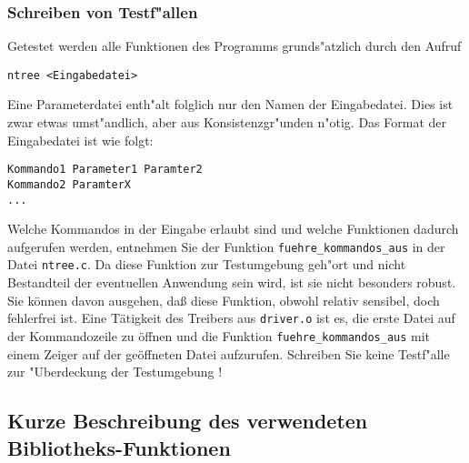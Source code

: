 \subsubsection*{Schreiben von Testf"allen}

Getestet werden alle Funktionen des Programms grunds"atzlich durch den
Aufruf 
\begin{verbatim}
ntree <Eingabedatei>
\end{verbatim}
Eine Parameterdatei enth"alt folglich nur den Namen der Eingabedatei. Dies
ist zwar etwas umst"andlich, aber aus Konsistenzgr"unden n"otig.
Das Format der Eingabedatei ist wie folgt:
\begin{verbatim}
Kommando1 Parameter1 Paramter2
Kommando2 ParamterX
...
\end{verbatim}

Welche Kommandos in der Eingabe erlaubt sind und welche Funktionen
dadurch aufgerufen werden, entnehmen Sie der Funktion 
{\tt fuehre\_kommandos\_aus} in der Datei {\tt ntree.c}.
Da diese Funktion zur Testumgebung geh"ort und nicht Bestandteil der 
eventuellen Anwendung sein wird, ist sie nicht besonders robust.
Sie k\"onnen davon ausgehen, da{\ss} diese Funktion, obwohl
relativ sensibel, doch fehlerfrei ist.
Eine T\"atigkeit des Treibers aus {\tt driver.o} ist es, 
die erste Datei auf der Kommandozeile zu \"offnen 
und die Funktion {\tt fuehre\_kommandos\_aus} mit einem Zeiger 
auf der ge\"offneten Datei aufzurufen. 
Schreiben Sie keine Testf"alle zur "Uberdeckung der Testumgebung !


\subsection*{Kurze Beschreibung des verwendeten Bibliotheks-Funktionen}

